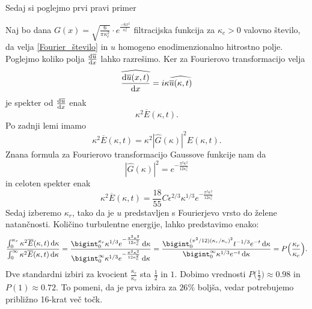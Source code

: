 \documentclass[mat2, tisk]{fmfdelo}
\begin{document}
Sedaj si poglejmo prvi pravi primer 
\begin{primer}
Naj bo dana $G(x) = \sqrt{\frac{6}{\pi \kappa_c^2}}\cdot e^\frac{-6x^2}{\kappa_c^2}$ filtracijska funkcija 
za $\kappa_c > 0$ valovno število, da velja \ref{Fourier_število} in $u$ homogeno enodimenzionalno hitrostno polje. Poglejmo koliko polja $\frac{\dif \overline{u}}{\dif x}$
lahko razrešimo. Ker za Fourierovo transformacijo velja
$$
\widehat{\frac{\dif \overline{u}(x, t)}{\dif x}} = i\kappa \widehat{\overline{u}(\kappa, t)}
$$
je spekter od $\frac{\dif \overline{u}}{\dif x}$ enak 
$$
\kappa^2 \overline{E}(\kappa, t).
$$
Po zadnji lemi imamo 
$$
\kappa^2 \overline{E}(\kappa, t) = \kappa^2 |\hat{G}(\kappa)|^2 E(\kappa, t).
$$
Znana formula za Fourierovo transformacijo Gaussove funkcije nam da
$$
|\hat{G}(\kappa)|^2 = e^{-\frac{\pi^2 \kappa^2}{12\kappa_c^2}}
$$
in celoten spekter enak 
$$
\kappa^2 \overline{E}(\kappa, t) = \frac{18}{55} C\epsilon^{2/3} \kappa^{1/3} e^{-\frac{\pi^2 \kappa^2}{12\kappa_c^2}}
$$
Sedaj izberemo $\kappa_r$, tako da je $u$ predstavljen s Fourierjevo vrsto 
do želene natančnosti. Količino turbulentne energije, lahko predstavimo enako:
\begin{align*}
\frac{\int_{0}^{\kappa_r} \kappa^2 \overline{E}(\kappa, t)\dif \kappa}{\int_{0}^{\infty} \kappa^2 \overline{E}(\kappa, t)\dif \kappa} = \frac{\bigint_0^{\kappa_r} \kappa^{1/3} e^{-\frac{\pi^2 \kappa^2}{12\kappa_c^2}}\dif \kappa}{\bigint_{0}^{\infty} \kappa^{1/3} e^{-\frac{\pi^2 \kappa^2}{12\kappa_c^2}}\dif \kappa} = 
\frac{\bigint_0^{(\pi^2/12)(\kappa_r/\kappa_c)^2} t^{-1/3} e^{-t}\dif \kappa}{\bigint_{0}^{\infty} \kappa^{1/3} e^{-t}\dif \kappa} = P\Big(\frac{\kappa_r}{\kappa_c}\Big).
\end{align*}
Dve standardni izbiri za kvocient $\frac{\kappa_r}{\kappa_c}$ sta $\frac{1}{2}$ in $1$.
Dobimo vrednosti $P\Big(\frac{1}{2}\Big) \approx 0.98$ in 
$P(1) \approx 0.72$. To pomeni, da je prva izbira za $26\%$ boljša, 
vedar potrebujemo približno 16-krat več točk.
\end{primer}
\end{document}

